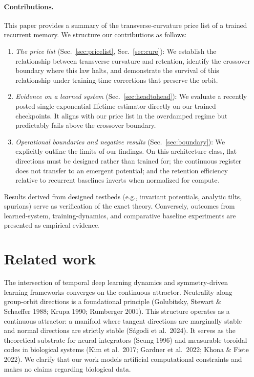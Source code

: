 \documentclass{article}
\begin{document}
\paragraph{Contributions.} This paper provides a summary of the transverse-curvature price list of a trained recurrent memory. We structure our contributions as follows:
\begin{enumerate}
\item \emph{The price list} (Sec.~\ref{sec:pricelist}, Sec.~\ref{sec:cure}): We establish the relationship between transverse curvature and retention, identify the crossover boundary where this law halts, and demonstrate the survival of this relationship under training-time corrections that preserve the orbit.
\item \emph{Evidence on a learned system} (Sec.~\ref{sec:headtohead}): We evaluate a recently posted single-exponential lifetime estimator directly on our trained checkpoints. It aligns with our price list in the overdamped regime but predictably fails above the crossover boundary.
\item \emph{Operational boundaries and negative results} (Sec.~\ref{sec:boundary}): We explicitly outline the limits of our findings. On this architecture class, flat directions must be designed rather than trained for; the continuous register does not transfer to an emergent potential; and the retention efficiency relative to recurrent baselines inverts when normalized for compute.
\end{enumerate}
Results derived from designed testbeds (e.g., invariant potentials, analytic tilts, spurions) serve as verification of the exact theory. Conversely, outcomes from learned-system, training-dynamics, and comparative baseline experiments are presented as empirical evidence.

\section{Related work}\label{sec:related}

The intersection of temporal deep learning dynamics and symmetry-driven learning frameworks converges on the continuous attractor. Neutrality along group-orbit directions is a foundational principle (Golubitsky, Stewart \& Schaeffer 1988; Krupa 1990; Rumberger 2001). This structure operates as a continuous attractor: a manifold where tangent directions are marginally stable and normal directions are strictly stable (S\'agodi et al.\ 2024). It serves as the theoretical substrate for neural integrators (Seung 1996) and measurable toroidal codes in biological systems (Kim et al.\ 2017; Gardner et al.\ 2022; Khona \& Fiete 2022). We clarify that our work models artificial computational constraints and makes no claims regarding biological data.
\end{document}
